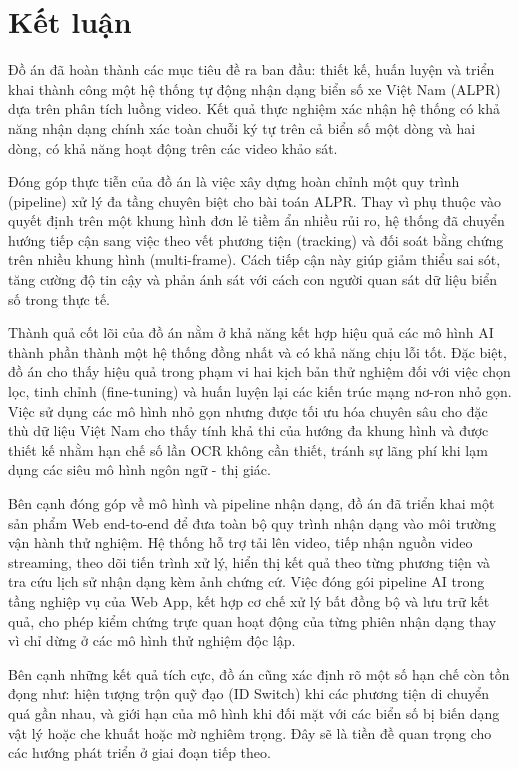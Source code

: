 \documentclass[../DoAn.tex]{subfiles}
\begin{document}
\section{Kết luận}

Đồ án đã hoàn thành các mục tiêu đề ra ban đầu: thiết kế, huấn luyện và triển khai thành công một hệ thống tự động nhận dạng biển số xe Việt Nam (ALPR) dựa trên phân tích luồng video. Kết quả thực nghiệm xác nhận hệ thống có khả năng nhận dạng chính xác toàn chuỗi ký tự trên cả biển số một dòng và hai dòng, có khả năng hoạt động trên các video khảo sát.

Đóng góp thực tiễn của đồ án là việc xây dựng hoàn chỉnh một quy trình (pipeline) xử lý đa tầng chuyên biệt cho bài toán ALPR. Thay vì phụ thuộc vào quyết định trên một khung hình đơn lẻ tiềm ẩn nhiều rủi ro, hệ thống đã chuyển hướng tiếp cận sang việc theo vết phương tiện (tracking) và đối soát bằng chứng trên nhiều khung hình (multi-frame). Cách tiếp cận này giúp giảm thiểu sai sót, tăng cường độ tin cậy và phản ánh sát với cách con người quan sát dữ liệu biển số trong thực tế.

Thành quả cốt lõi của đồ án nằm ở khả năng kết hợp hiệu quả các mô hình AI thành phần thành một hệ thống đồng nhất và có khả năng chịu lỗi tốt. Đặc biệt, đồ án cho thấy hiệu quả trong phạm vi hai kịch bản thử nghiệm đối với việc chọn lọc, tinh chỉnh (fine-tuning) và huấn luyện lại các kiến trúc mạng nơ-ron nhỏ gọn. Việc sử dụng các mô hình nhỏ gọn nhưng được tối ưu hóa chuyên sâu cho đặc thù dữ liệu Việt Nam cho thấy tính khả thi của hướng đa khung hình và được thiết kế nhằm hạn chế số lần OCR không cần thiết, tránh sự lãng phí khi lạm dụng các siêu mô hình ngôn ngữ - thị giác.

Bên cạnh đóng góp về mô hình và pipeline nhận dạng, đồ án đã triển khai một sản phẩm Web end-to-end để đưa toàn bộ quy trình nhận dạng vào môi trường vận hành thử nghiệm. Hệ thống hỗ trợ tải lên video, tiếp nhận nguồn video streaming, theo dõi tiến trình xử lý, hiển thị kết quả theo từng phương tiện và tra cứu lịch sử nhận dạng kèm ảnh chứng cứ. Việc đóng gói pipeline AI trong tầng nghiệp vụ của Web App, kết hợp cơ chế xử lý bất đồng bộ và lưu trữ kết quả, cho phép kiểm chứng trực quan hoạt động của từng phiên nhận dạng thay vì chỉ dừng ở các mô hình thử nghiệm độc lập.

Bên cạnh những kết quả tích cực, đồ án cũng xác định rõ một số hạn chế còn tồn đọng như: hiện tượng trộn quỹ đạo (ID Switch) khi các phương tiện di chuyển quá gần nhau, và giới hạn của mô hình khi đối mặt với các biển số bị biến dạng vật lý hoặc che khuất hoặc mờ nghiêm trọng. Đây sẽ là tiền đề quan trọng cho các hướng phát triển ở giai đoạn tiếp theo.
\end{document}

